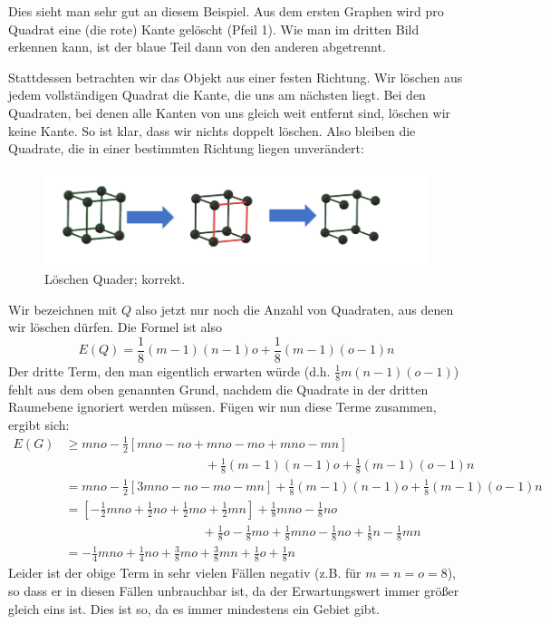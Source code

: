 \documentclass[11pt,a4paper]{article}
\numberwithin{equation}{section}
\numberwithin{table}{section}
\numberwithin{figure}{section}
\begin{document}
Dies sieht man sehr gut an diesem Beispiel. Aus dem ersten Graphen wird pro Quadrat eine (die rote) Kante gelöscht (Pfeil 1). Wie man im dritten Bild erkennen kann, ist der blaue Teil dann von den anderen abgetrennt.\par
\noindent
Stattdessen betrachten wir das Objekt aus einer festen Richtung. Wir löschen aus jedem vollständigen Quadrat die Kante, die uns am nächsten liegt. Bei den Quadraten, bei denen alle Kanten von uns gleich weit entfernt sind, löschen wir keine Kante. So ist klar, dass wir nichts doppelt löschen. Also bleiben die Quadrate, die in einer bestimmten Richtung liegen unverändert:
\begin{center}
\begin{figure}[H]\label{bild6b}
\begin{center}\includegraphics[scale=0.8]{6b.PNG}
\caption{Löschen Quader; korrekt.}\end{center}
\end{figure}
\end{center}
Wir bezeichnen mit $Q$ also jetzt nur noch die Anzahl von Quadraten, aus denen wir löschen dürfen. 
Die Formel ist also
 $$E(Q)=\frac{1}{8}(m-1)(n-1)o+\frac{1}{8}(m-1)(o-1)n$$ Der dritte Term, den man eigentlich erwarten würde (d.h. $\frac{1}{8}m(n-1)(o-1)$) fehlt aus dem oben genannten Grund, nachdem die  Quadrate in der dritten Raumebene ignoriert werden müssen. 
Fügen wir nun diese Terme zusammen, ergibt sich:\small
\begin{align*}
E(G)&\geq mno-\frac{1}{2} [mno-no+mno-mo+mno-mn]\\
&\phantom{blablablablablabablablabla}+\frac{1}{8} (m-1)(n-1)o+\frac{1}{8} (m-1)(o-1)n\\
&=mno-\frac{1}{2} [3mno-no-mo-mn]+\frac{1}{8} (m-1)(n-1)o+\frac{1}{8} (m-1)(o-1)n\\
&=[-\frac{1}{2} mno+\frac{1}{2} no+\frac{1}{2} mo+\frac{1}{2} mn]+\frac{1}{8} mno-\frac{1}{8} no\\
&\phantom{blablablabblablalblablabla}+\frac{1}{8} o-\frac{1}{8} mo+\frac{1}{8} mno-\frac{1}{8} no+\frac{1}{8} n-\frac{1}{8} mn\\
&=-\frac{1}{4} mno+\frac{1}{4} no+\frac{3}{8} mo+\frac{3}{8} mn+\frac{1}{8} o+\frac{1}{8} n
\end{align*}\normalsize
Leider ist der obige Term in sehr vielen Fällen negativ (z.B. für $m=n=o=8$), so dass er in diesen Fällen unbrauchbar ist, da der Erwartungswert immer größer gleich eins ist. Dies ist so, da es immer mindestens ein Gebiet gibt. \par\noindent
\end{document}
